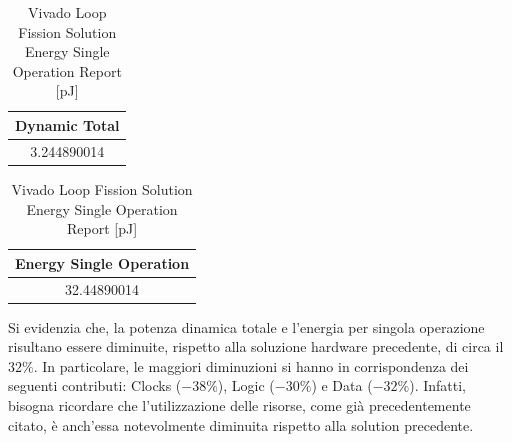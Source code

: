 \begin{table}[H]
    \centering
    \begin{minipage}[t]{0.45\linewidth}
        \centering
        \begin{tabular}{|c|}
            \hline
            \textbf{Dynamic Total} \\
            \hline
            3.244890014 \\
            \hline
        \end{tabular}
        \caption{Vivado Loop Fission Solution Dynamic Power Report [mW]}
        \label{tab:vivado-loop-fission-solution-dynamic-power-reproot}
    \end{minipage}
    \hfill
    \centering
    \begin{minipage}[t]{0.45\linewidth}
        \centering
        \begin{tabular}{|c|}
            \hline
            \textbf{Energy Single Operation} \\
            \hline
            32.44890014 \\
            \hline
        \end{tabular}
        \caption{Vivado Loop Fission Solution Energy Single Operation Report [pJ]}
        \label{tab:vivado-loop-fission-solution-energy-single-operation-reproot}
    \end{minipage}
\end{table}

Si evidenzia che, la potenza dinamica totale e l'energia per singola operazione risultano essere diminuite, rispetto alla soluzione hardware precedente, di circa il $32\%$. In particolare, le maggiori diminuzioni si hanno in corrispondenza dei seguenti contributi: Clocks ($-38\%$), Logic ($-30\%$) e Data ($-32\%$). Infatti, bisogna ricordare che l'utilizzazione delle risorse, come già precedentemente citato, è anch'essa notevolmente diminuita rispetto alla solution precedente. 
